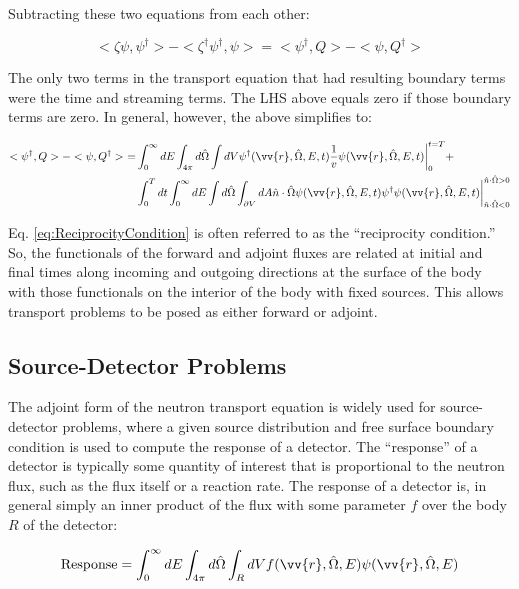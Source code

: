 \documentclass[10pt]{article}
\begin{document}
\begin{flushleft}
 Subtracting these two equations from each other:
 
 \begin{equation}
 <\zeta\psi,\psi^\dagger>-<\zeta^\dagger\psi^\dagger,\psi>=<\psi^\dagger,Q>-<\psi,Q^\dagger>
 \end{equation}

The only two terms in the transport equation that had resulting boundary terms were the time and streaming terms. The LHS above equals zero if those boundary terms are zero. In general, however, the above simplifies to:

\begin{equation}
\label{eq:ReciprocityCondition}
\begin{aligned}
<\psi^\dagger,Q>-<\psi,Q^\dagger> \ =& \int_0^\infty dE\int_{4\pi}d\hat{\Omega}\int dV\psi^\dagger (\vv{r},\hat{\Omega},E,t)\frac{1}{v} \psi(\vv{r},\hat{\Omega},E,t)\biggr\rvert_{0}^{t=T} +\\
& \int_0^{T}dt\int_0^\infty dE\int d\hat{\Omega}\int_{\partial V}dA\hat{n}\cdot\hat{\Omega}\psi(\vv{r},\hat{\Omega},E,t)\psi^\dagger\psi(\vv{r},\hat{\Omega},E,t)\biggr\rvert_{\hat{n}\cdot\hat{\Omega}<0}^{\hat{n}\cdot\hat{\Omega}>0}
\end{aligned}
\end{equation}

Eq. \eqref{eq:ReciprocityCondition} is often referred to as the ``reciprocity condition.'' So, the functionals of the forward and adjoint fluxes are related at initial and final times along incoming and outgoing directions at the surface of the body with those functionals on the interior of the body with fixed sources. This allows transport problems to be posed as either forward or adjoint. 

\subsection{Source-Detector Problems}

The adjoint form of the neutron transport equation is widely used for source-detector problems, where a given source distribution and free surface boundary condition is used to compute the response of a detector. The ``response'' of a detector is typically some quantity of interest that is proportional to the neutron flux, such as the flux itself or a reaction rate. The response of a detector is, in general simply an inner product of the flux with some parameter \(f\) over the body \(R\) of the detector:

\begin{equation}
\label{eq:Response}
\textrm{Response}=\int_0^\infty dE\int_{4\pi}d\hat{\Omega}\int_RdVf(\vv{r},\hat{\Omega},E)\psi(\vv{r},\hat{\Omega},E)
\end{equation}


\end{flushleft}
\end{document}
